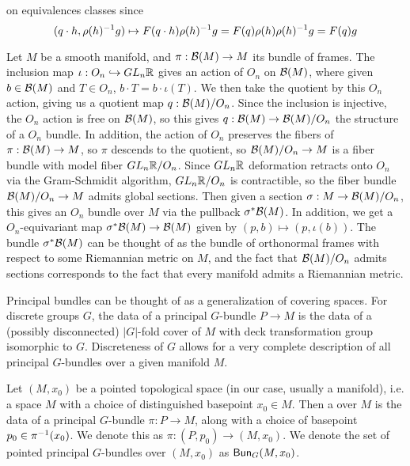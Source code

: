 on equivalences classes since
\[
(q \cdot h, \rho(h)^{-1} g) \mapsto F(q \cdot h)\rho(h)^{-1} g = F(q)\rho(h)\rho(h)^{-1} g
= F(q)g
\]
%
\begin{exmp}
Let $M$ be a smooth manifold, and $\pi : \mathcal{B}(M) \to M$ its bundle of frames.
The inclusion map $\iota: O_n \hookrightarrow GL_n\mathbb{R}$ gives an action of $O_n$ on
$\mathcal{B}(M)$, where given $b \in \mathcal{B}(M)$ and $T \in O_n$, $b \cdot T = b \cdot \iota(T)$.
We then take the quotient by this $O_n$ action, giving us a quotient map
$q : \mathcal{B}(M) / O_n$. Since the inclusion is injective, the $O_n$ action
is free on $\mathcal{B}(M)$, so this gives $q : \mathcal{B}(M) \to \mathcal{B}(M) / O_n$ the structure of a
$O_n$ bundle. In addition, the action of $O_n$ preserves the fibers of
$\pi : \mathcal{B}(M) \to M$, so $\pi$ descends to the quotient, so $\mathcal{B}(M) / O_n \to M$
is a fiber bundle with model fiber $GL_n\mathbb{R} / O_n$. Since $GL_n\mathbb{R}$ deformation
retracts onto $O_n$ via the Gram-Schmidit algorithm, $GL_n\mathbb{R} / O_n$ is
contractible, so the fiber bundle $\mathcal{B}(M)/ O_n \to M$ admits global sections.
Then given a section $\sigma : M \to \mathcal{B}(M) / O_n$, this gives an $O_n$ bundle
over $M$ via the pullback $\sigma^*\mathcal{B}(M)$. In addition, we get a $O_n$-equivariant
map $\sigma^*\mathcal{B}(M) \to \mathcal{B}(M)$ given by $(p, b) \mapsto (p, \iota(b))$. The
bundle $\sigma^*\mathcal{B}(M)$ can be thought of as the bundle of orthonormal frames
with respect to some Riemannian metric on $M$, and the fact that $\mathcal{B}(M) / O_n$
admits sections corresponds to the fact that every manifold admits a Riemannian
metric.
\end{exmp}
%
Principal bundles can be thought of as a generalization of covering spaces.
For discrete groups $G$, the data of a principal $G$-bundle $P \to M$ is the
data of a (possibly disconnected) $|G|$-fold cover of $M$ with deck transformation
group isomorphic to $G$. Discreteness of $G$ allows for a very complete description
of all principal $G$-bundles over a given manifold $M$.
%
\begin{defn}
Let $(M,x_0)$ be a pointed topological space (in our case, usually a manifold),
i.e. a space $M$ with a choice of distinguished basepoint $x_0 \in M$. Then
a  over $M$ is the data of a principal $G$-bundle
$\pi : P \to M$, along with a choice of basepoint $p_0 \in \pi^{-1}(x_0)$. We
denote this as $\pi : (P,p_0) \to (M, x_0)$. We denote the set of pointed principal
$G$-bundles over $(M,x_0)$ as $\mathsf{Bun}_G(M ,x_0)$.
\end{defn}

